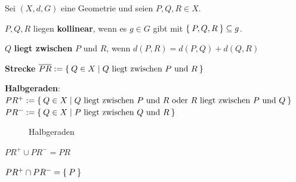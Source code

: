 \begin{definition}
    Sei $(X, d, G)$ eine Geometrie und seien $P, Q, R \in X$.
    \begin{defenum}
        \item $P, Q, R$ liegen \textbf{kollinear}, 
              wenn es $g \in G$ gibt mit $\Set{P, Q, R} \subseteq g$.
        \item $Q$ \textbf{liegt zwischen} $P$
              und $R$, wenn $d(P, R) = d(P, Q) + d(Q, R)$
        \item \textbf{Strecke} $\overline{PR} := \Set{Q \in X | Q \text{ liegt zwischen } P \text{ und } R}$
        \item \textbf{Halbgeraden}:\\
              $PR^+ := \Set{Q \in X | Q \text{ liegt zwischen } P \text{ und } R \text{ oder } R \text{ liegt zwischen } P \text{ und } Q}$\\
              $PR^- := \Set{Q \in X | P \text{ liegt zwischen } Q \text{ und } R}$\\ 
    \end{defenum}
\end{definition}

\begin{figure}[htp]
    \centering
    
    \caption{Halbgeraden}
    \label{fig:halbgeraden}
\end{figure}

\begin{bemerkung}
    \begin{bemenum}
        \item $PR^+ \cup PR^- = PR$
        \item $PR^+ \cap PR^- = \Set{P}$
    \end{bemenum}
\end{bemerkung}

